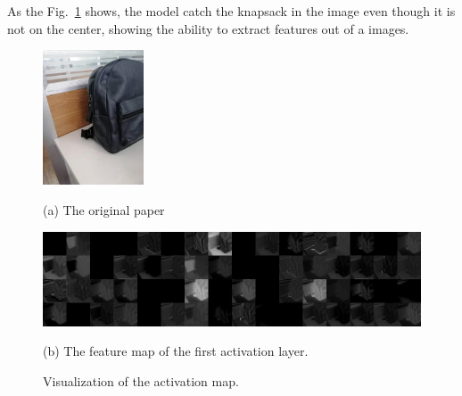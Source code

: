 As the Fig.~\ref{fig:actmap} shows, the model catch the knapsack in the image even though it is not on the center, showing the ability to 
extract features out of a images.

\begin{figure}[h]
  \begin{minipage}[b]{\linewidth}
    \centering
    \includegraphics[height=4cm]{figs/img_7224.jpg}
    \centerline{(a) The original paper}
    \vspace{1mm}
  \end{minipage}
  \begin{minipage}[b]{\linewidth}
    \centering
    \includegraphics[width=12cm]{figs/ReLU_2.jpg}
    \centerline{(b) The feature map of the first activation layer.}
  \end{minipage}
  \caption{Visualization of the activation map.}
  \label{fig:actmap}
\end{figure}